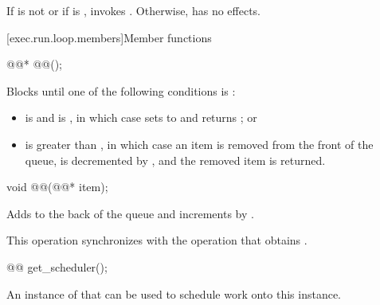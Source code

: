 \begin{itemdescr}
\pnum
\effects
If  is not  or if  is ,
invokes .
Otherwise, has no effects.
\end{itemdescr}

[exec.run.loop.members]{Member functions}

\begin{itemdecl}
@@* @@();
\end{itemdecl}

\begin{itemdescr}
\pnum
\effects
Blocks until one of the following conditions is :
\begin{itemize}
\item
{} is  and  is ,
in which case  sets  to 
and returns ; or
\item
{} is greater than ,
in which case an item is removed from the front of the queue,
 is decremented by , and
the removed item is returned.
\end{itemize}
\end{itemdescr}

\begin{itemdecl}
void @@(@@* item);
\end{itemdecl}

\begin{itemdescr}
\pnum
\effects
Adds  to the back of the queue and
increments  by .

\pnum
\sync
This operation synchronizes with
the  operation that obtains .
\end{itemdescr}

%
\begin{itemdecl}
@@ get_scheduler();
\end{itemdecl}

\begin{itemdescr}
\pnum
\returns
An instance of 
that can be used to schedule work onto this  instance.
\end{itemdescr}

